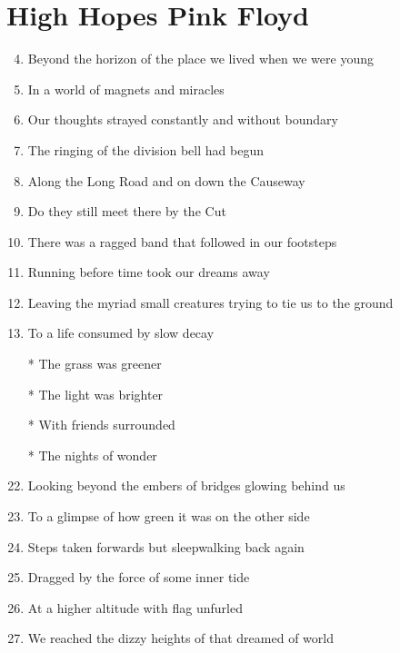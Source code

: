 \documentclass{article}
\begin{document}
    
    \section*{High Hopes \by Pink Floyd }

    \begin{center}
        \begin{enumerate}
            \item[] \intro

            \item[]
            \item[] 
            \item Beyond the horizon of the place we lived when we were young
            \item In a world of magnets and miracles
            \item Our thoughts strayed constantly and without boundary
            \item The ringing of the division bell had begun
            \item Along the Long Road and on down the Causeway
            \item Do they still meet there by the Cut
            \item There was a ragged band that followed in our footsteps
            \item Running before time took our dreams away
            \item Leaving the myriad small creatures trying to tie us to the ground
            \item To a life consumed by slow decay

            \item[]
            \item[] \chorus
            \item[*] The grass was greener
            \item[*] The light was brighter
            \item[*] With friends surrounded
            \item[*] The nights of wonder
            
            \item[]
            \item[] 
            \item Looking beyond the embers of bridges glowing behind us
            \item To a glimpse of how green it was on the other side
            \item Steps taken forwards but sleepwalking back again
            \item Dragged by the force of some inner tide
            \item At a higher altitude with flag unfurled
            \item We reached the dizzy heights of that dreamed of world


\end{enumerate}
\end{center}
\end{document}
